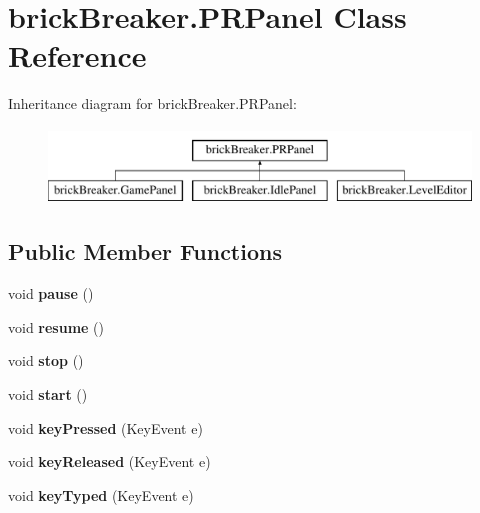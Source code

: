 \hypertarget{classbrick_breaker_1_1_p_r_panel}{
\section{brickBreaker.PRPanel Class Reference}
\label{classbrick_breaker_1_1_p_r_panel}
}
Inheritance diagram for brickBreaker.PRPanel:\begin{figure}[H]
\begin{center}
\leavevmode
\includegraphics[height=2cm]{classbrick_breaker_1_1_p_r_panel}
\end{center}
\end{figure}
\subsection*{Public Member Functions}
\begin{DoxyCompactItemize}
\item 
\hypertarget{classbrick_breaker_1_1_p_r_panel_a0868e501fc5599973492e6f0c53da920}{
void {\bfseries pause} ()}
\label{classbrick_breaker_1_1_p_r_panel_a0868e501fc5599973492e6f0c53da920}

\item 
\hypertarget{classbrick_breaker_1_1_p_r_panel_ac9aadc88543f9032a27f3eb2b8ea908b}{
void {\bfseries resume} ()}
\label{classbrick_breaker_1_1_p_r_panel_ac9aadc88543f9032a27f3eb2b8ea908b}

\item 
\hypertarget{classbrick_breaker_1_1_p_r_panel_ad077fab978f84663f366a6fdde5efe6c}{
void {\bfseries stop} ()}
\label{classbrick_breaker_1_1_p_r_panel_ad077fab978f84663f366a6fdde5efe6c}

\item 
\hypertarget{classbrick_breaker_1_1_p_r_panel_a94e190e70d6aa937068cbf5e8cff523e}{
void {\bfseries start} ()}
\label{classbrick_breaker_1_1_p_r_panel_a94e190e70d6aa937068cbf5e8cff523e}

\item 
\hypertarget{classbrick_breaker_1_1_p_r_panel_af86ccc2d42dc48eb03fb6db22e593fc2}{
void {\bfseries keyPressed} (KeyEvent e)}
\label{classbrick_breaker_1_1_p_r_panel_af86ccc2d42dc48eb03fb6db22e593fc2}

\item 
\hypertarget{classbrick_breaker_1_1_p_r_panel_a3485136bec68dd500b98039bd7a87e8e}{
void {\bfseries keyReleased} (KeyEvent e)}
\label{classbrick_breaker_1_1_p_r_panel_a3485136bec68dd500b98039bd7a87e8e}

\item 
\hypertarget{classbrick_breaker_1_1_p_r_panel_a51bdf51ab7141c16101753e4180c970a}{
void {\bfseries keyTyped} (KeyEvent e)}
\label{classbrick_breaker_1_1_p_r_panel_a51bdf51ab7141c16101753e4180c970a}

\end{DoxyCompactItemize}


